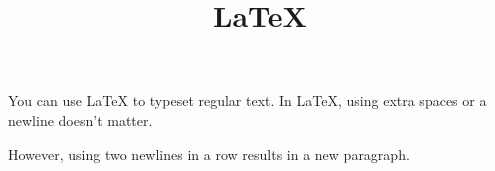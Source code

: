 \documentclass[12pt]{article}
\title{\LaTeX}
\date{}
\begin{document}
You can use LaTeX to typeset regular text.
In LaTeX,     using extra spaces
or      a newline       doesn't matter.

However,
using   two newlines in a row
results in a new paragraph.
\end{document}
